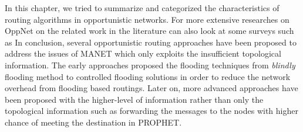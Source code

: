 In this chapter, we tried to summarize and categorized the characteristics of routing algorithms in opportunistic networks.
For more extensive researches on OppNet on the related work in the literature can also look at some surveys such as \cite{Yue2013, Souza2010, Poonguzharselvi2013a, Nousiainen2013, Behrouz2013, Wahid2014}	
In conclusion, several opportunistic routing approaches have been proposed to address the issues of MANET which only exploits the insufficient topological information.
The early approaches proposed the flooding techniques from \emph{blindly} flooding method to controlled flooding solutions in order to reduce the network overhead from flooding based routings.
Later on, more advanced approaches have been proposed with the higher-level of information rather than only the topological information such as forwarding the messages to the nodes with higher chance of meeting the destination in PROPHET.


